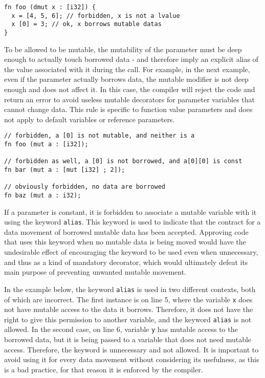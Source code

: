 \begin{lstlisting}[style=coloredverbatim]
fn foo (dmut x : [i32]) {
  x = [4, 5, 6]; // forbidden, x is not a lvalue
  x [0] = 3; // ok, x borrows mutable datas
}
\end{lstlisting}

To be allowed to be mutable, the mutability of the parameter must be deep enough
to actually touch borrowed data - and therefore imply an explicit alias of the
value associated with it during the call. For example, in the next example, even
if the parameter actually borrows data, the mutable modifier is not deep enough
and does not affect it. In this case, the compiler will reject the code and
return an error to avoid useless mutable decorators for parameter variables that
cannot change data. This rule is specific to function value parameters and does
not apply to default variables or reference parameters.

\begin{lstlisting}[style=coloredverbatim]
// forbidden, a [0] is not mutable, and neither is a
fn foo (mut a : [i32]);

// forbidden as well, a [0] is not borrowed, and a[0][0] is const
fn bar (mut a : [mut [i32] ; 2]);

// obviously forbidden, no data are borrowed
fn baz (mut a : i32);
\end{lstlisting}


If a parameter is constant, it is forbidden to associate a mutable variable with it using the keyword \texttt{alias}. This keyword is used to indicate that the contract for a data movement of borrowed mutable data has been accepted. Approving code that uses this keyword when no mutable data is being moved would have the undesirable effect of encouraging the keyword to be used even when unnecessary, and thus as a kind of mandatory decorator, which would ultimately defeat its main purpose of preventing unwanted mutable movement.

In the example below, the keyword \texttt{alias} is used in two different
contexts, both of which are incorrect. The first instance is on line 5, where
the variable \texttt{x} does not have mutable access to the data it borrows.
Therefore, it does not have the right to give this permission to another
variable, and the keyword \texttt{alias} is not allowed. In the second case, on
line 6, variable \texttt{y} has mutable access to the borrowed data, but it is
being passed to a variable that does not need mutable access. Therefore, the
keyword is unnecessary and not allowed. It is important to avoid using it for
every data movement without considering its usefulness, as this is a bad
practice, for that reason it is enforced by the compiler.

